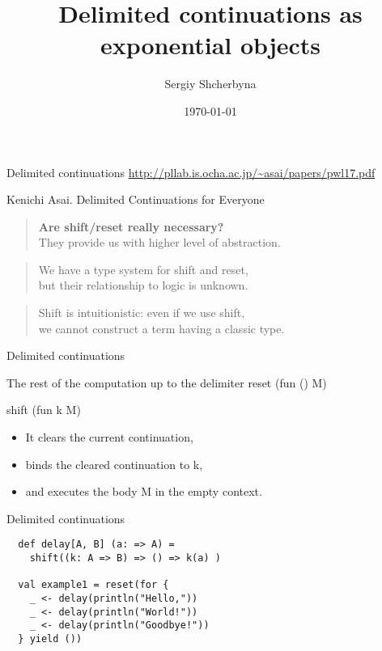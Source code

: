 \documentclass{beamer}
\title{Delimited continuations as exponential objects}
\date{\today}
\author{Sergiy Shcherbyna}
\begin{document}
    \maketitle

    \begin{frame}[fragile]{Delimited continuations}
        \url{http://pllab.is.ocha.ac.jp/~asai/papers/pwl17.pdf}
        \begin{block}{Kenichi Asai. Delimited Continuations for Everyone}
            \begin{quote}
                \textbf{Are shift/reset really necessary?} \\
                They provide us with higher level of \alert{abstraction}.
            \end{quote}
            \begin{quote}
                We have a \alert{type system} for shift and reset, \\
                but their relationship to logic is \alert{unknown}.
            \end{quote}
            \begin{quote}
                Shift is \alert{intuitionistic}: even if we use shift, \\
                we cannot construct a term having a classic type.
            \end{quote}
        \end{block}
    \end{frame}

    \begin{frame}[fragile]{Delimited continuations}
        \begin{block}{The rest of the computation up to the delimiter}
            reset (fun () \rightarrow M)
        \end{block}
        \begin{definition}
            shift (fun k \rightarrow M)
            \begin{itemize}
                \item It clears the current continuation,
                \item binds the cleared continuation to k,
                \item and executes the body M in the empty context.
            \end{itemize}
        \end{definition}
    \end{frame}

    \begin{frame}[fragile]{Delimited continuations}
        \begin{example}
            \begin{lstlisting}
  def delay[A, B] (a: => A) =
    shift((k: A => B) => () => k(a) )

  val example1 = reset(for {
    _ <- delay(println("Hello,"))
    _ <- delay(println("World!"))
    _ <- delay(println("Goodbye!"))
  } yield ())
            \end{lstlisting}
        \end{example}
    \end{frame}
\end{document}
